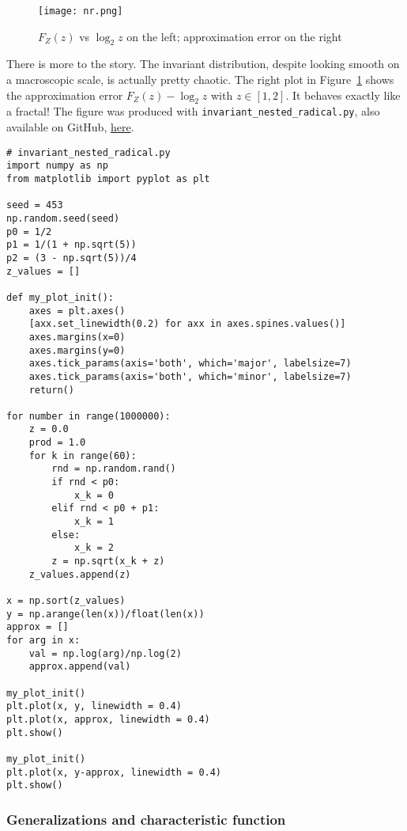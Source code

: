 \documentclass[oneside,10pt]{book}
\begin{document}
\begin{figure}[H]
\centering
\texttt{[image: nr.png]}  
\caption{$F_Z(z)$ vs $\log_2 z$ on the left; approximation error on the right}
\label{fig:botul}
\end{figure}




There is more to the story. The invariant distribution, despite looking smooth on a macroscopic scale, is actually pretty chaotic.
The right plot in Figure~\ref{fig:botul} shows the approximation error $F_Z(z)-\log_2 z$ with $z\in [1,2]$. It behaves exactly like a fractal! 
The figure was produced with \texttt{invariant\_nested\_radical.py}, also available
 on GitHub,  \href{https://github.com/VincentGranville/Stochastic-Processes/blob/master/invariant_nested_radicals.py}{here}.\vspace{1ex}

\begin{lstlisting}
# invariant_nested_radical.py
import numpy as np
from matplotlib import pyplot as plt

seed = 453
np.random.seed(seed)
p0 = 1/2
p1 = 1/(1 + np.sqrt(5))
p2 = (3 - np.sqrt(5))/4
z_values = []

def my_plot_init():
    axes = plt.axes()
    [axx.set_linewidth(0.2) for axx in axes.spines.values()]
    axes.margins(x=0)
    axes.margins(y=0)
    axes.tick_params(axis='both', which='major', labelsize=7)
    axes.tick_params(axis='both', which='minor', labelsize=7)
    return()

for number in range(1000000):
    z = 0.0
    prod = 1.0
    for k in range(60):
        rnd = np.random.rand()
        if rnd < p0:
            x_k = 0
        elif rnd < p0 + p1:
            x_k = 1
        else:
            x_k = 2
        z = np.sqrt(x_k + z)
    z_values.append(z)

x = np.sort(z_values)
y = np.arange(len(x))/float(len(x))
approx = []
for arg in x:
    val = np.log(arg)/np.log(2)
    approx.append(val) 

my_plot_init()
plt.plot(x, y, linewidth = 0.4)
plt.plot(x, approx, linewidth = 0.4)
plt.show()

my_plot_init()
plt.plot(x, y-approx, linewidth = 0.4)
plt.show()
\end{lstlisting}

\subsubsection{Generalizations and characteristic function}
\end{document}
